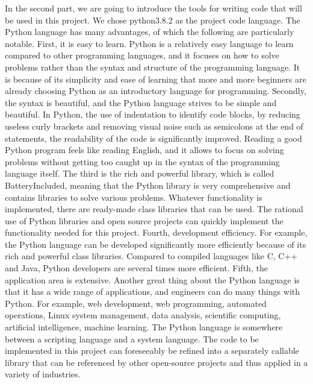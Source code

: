 \documentclass{sigchi}
\begin{document}
In the second part, we are going to introduce the tools for writing code that will be used in this project. We chose python3.8.2 as the project code language. The Python language has many advantages, of which the following are particularly notable. First, it is easy to learn. Python is a relatively easy language to learn compared to other programming languages, and it focuses on how to solve problems rather than the syntax and structure of the programming language. It is because of its simplicity and ease of learning that more and more beginners are already choosing Python as an introductory language for programming. Secondly, the syntax is beautiful, and the Python language strives to be simple and beautiful. In Python, the use of indentation to identify code blocks, by reducing useless curly brackets and removing visual noise such as semicolons at the end of statements, the readability of the code is significantly improved. Reading a good Python program feels like reading English, and it allows to focus on solving problems without getting too caught up in the syntax of the programming language itself. The third is the rich and powerful library, which is called BatteryIncluded, meaning that the Python library is very comprehensive and contains libraries to solve various problems. Whatever functionality is implemented, there are ready-made class libraries that can be used. The rational use of Python libraries and open source projects can quickly implement the functionality needed for this project. Fourth, development efficiency. For example, the Python language can be developed significantly more efficiently because of its rich and powerful class libraries. Compared to compiled languages like C, C++ and Java, Python developers are several times more efficient. Fifth, the application area is extensive. Another great thing about the Python language is that it has a wide range of applications, and engineers can do many things with Python. For example, web development, web programming, automated operations, Linux system management, data analysis, scientific computing, artificial intelligence, machine learning. The Python language is somewhere between a scripting language and a system language. The code to be implemented in this project can foreseeably be refined into a separately callable library that can be referenced by other open-source projects and thus applied in a variety of industries.
\end{document}
